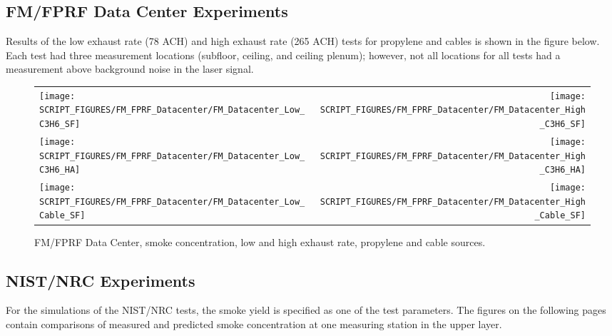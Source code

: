 \clearpage


\subsection{FM/FPRF Data Center Experiments}
\label{FM Smoke Concentration}

Results of the low exhaust rate (78 ACH) and high exhaust rate (265 ACH) tests for propylene and cables is shown in the figure below. Each test had three measurement locations (subfloor, ceiling, and ceiling plenum); however, not all locations for all tests had a measurement above background noise in the laser signal.

\begin{figure}[!h]
\begin{tabular*}{\textwidth}{l@{\extracolsep{\fill}}r}
\texttt{[image: SCRIPT\_FIGURES/FM\_FPRF\_Datacenter/FM\_Datacenter\_Low\_C3H6\_SF]} &
\texttt{[image: SCRIPT\_FIGURES/FM\_FPRF\_Datacenter/FM\_Datacenter\_High\_C3H6\_SF]} \\
\texttt{[image: SCRIPT\_FIGURES/FM\_FPRF\_Datacenter/FM\_Datacenter\_Low\_C3H6\_HA]} &
\texttt{[image: SCRIPT\_FIGURES/FM\_FPRF\_Datacenter/FM\_Datacenter\_High\_C3H6\_HA]} \\
\texttt{[image: SCRIPT\_FIGURES/FM\_FPRF\_Datacenter/FM\_Datacenter\_Low\_Cable\_SF]} &
\texttt{[image: SCRIPT\_FIGURES/FM\_FPRF\_Datacenter/FM\_Datacenter\_High\_Cable\_SF]}
\end{tabular*}
\caption[FM/FPRF Data Center, smoke concentration, propylene and cable sources]{FM/FPRF Data Center, smoke concentration, low and high exhaust rate, propylene and cable sources.}
\label{FM_FPRF_Datacenter_Smoke}
\end{figure}

\clearpage

\subsection{NIST/NRC Experiments}
\label{Smoke Concentration}

For the simulations of the NIST/NRC tests, the smoke yield is specified as one of the test parameters.
The figures on the following pages contain comparisons of measured and predicted smoke concentration at one measuring station in the upper layer.

\newpage

